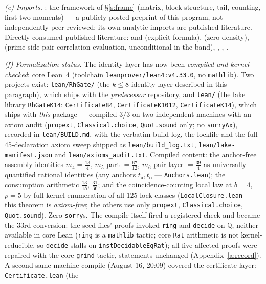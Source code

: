 \documentclass[11pt]{article}
\numberwithin{equation}{section}
\theoremstyle{definition}
\theoremstyle{remark}
\begin{document}
\emph{(e) Imports.} \cite{C26}: the framework of
\S\ref{s:frame} (matrix, block structure, tail, counting,
first two moments) --- a publicly posted preprint of this
program, not independently peer-reviewed; its own analytic
imports are published literature. Directly consumed published
literature: \cite{Wei52} and \cite[Thm.~5.12]{IK} (explicit
formula), \cite[Thm.~9.2]{Tit86} (zero density),
\cite{Mon73,BGST} (prime-side pair-correlation evaluation,
unconditional in the band), \cite{MRT}, \cite{HR},
\cite{Dav}.

\emph{(f) Formalization status.}
The identity layer has now been \emph{compiled and
kernel-checked}: core Lean~4
(toolchain \texttt{leanprover/lean4:v4.33.0}, no
\texttt{mathlib}). Two projects exist: \texttt{lean/RhGate/}
(the $k\le8$ identity layer described in this paragraph),
which ships with the \emph{predecessor} repository, and
\texttt{lean/} (the lake library \texttt{RhGateK14}:
\texttt{Certificate84},
\texttt{CertificateK1012}, \texttt{CertificateK14}), which
ships with \emph{this} package --- compiled $3/3$ on two
independent machines with an axiom audit
(\texttt{propext}, \texttt{Classical.choice},
\texttt{Quot.sound} only; no \texttt{sorryAx}), recorded in
\texttt{lean/BUILD.md}, with the verbatim build log, the lockfile and
the full 45-declaration axiom sweep shipped as
\texttt{lean/build\_log.txt}, \texttt{lean/lake-manifest.json} and
\texttt{lean/axioms\_audit.txt}. Compiled content: the anchor-free assembly identities
$m_4=\tfrac{13}4$, $m_5$-part $=\tfrac{67}{12}$, $m_6$
pair-layer $=\tfrac{39}4$ as universally quantified rational
identities (any anchors $t_{\mathrm a},t_{\mathrm o}$ ---
\texttt{Anchors.lean}); the consumption arithmetic
$\tfrac{13}{18}$, $\tfrac{31}{36}$; and the coincidence-counting
local law at $b=4$, $p=5$ by full kernel enumeration of all
$125$ lock classes (\texttt{LocalClosure.lean} --- this theorem
is \emph{axiom-free}; the others use only
\texttt{propext}, \texttt{Classical.choice},
\texttt{Quot.sound}). Zero \texttt{sorry}s. The compile itself
fired a registered check and became the $33$rd conversion: the
seed files' proofs invoked \texttt{ring} and \texttt{decide}
on $\mathbb Q$, neither available in core Lean (\texttt{ring}
is a \texttt{mathlib} tactic; core \texttt{Rat} arithmetic is
not kernel-reducible, so \texttt{decide} stalls on
\texttt{instDecidableEqRat}); all five affected proofs were
repaired with the core \texttt{grind} tactic, statements
unchanged (Appendix~\ref{a:record}). A second same-machine compile (August 16, 20:09) covered the
certificate layer: \texttt{Certificate.lean} (the
\end{document}
